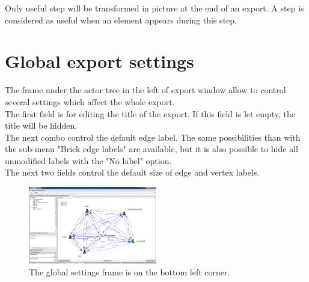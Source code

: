 Only useful step will be transformed in picture at the end of an export. A step is considered as useful when an element appears during this step.\\

\section{Global export settings}
\label{globalExport}
The frame under the actor tree in the left of export window allow to control several settings which affect the whole export.\\

The first field is for editing the title of the export. If this field is let empty, the title will be hidden.\\

The next combo control the default edge label. The same possibilities than with the sub-menu "Brick edge labels" are available, but it is also possible to hide all unmodified labels with the "No label" option.\\

The next two fields control the default size of edge and vertex labels.\\

\begin{figure}[h!]
\centering
\includegraphics[width=0.5\textwidth]{images/export_global.png}
\caption{The global settings frame is on the bottom left corner.}
\end{figure}

